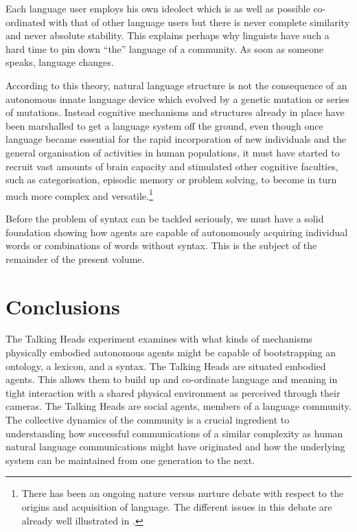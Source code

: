 Each language user employs his own ideolect which is 
as well as possible co-ordinated with that of other
language users but there is never complete similarity 
and never absolute stability.  
This explains perhaps why linguists have such a hard
time to pin down ``the'' language of a community. As soon 
as someone speaks, language changes. 

\enlargethispage{1\baselineskip}
According to this theory, natural language structure is
not the consequence of an 
autonomous innate language device which evolved 
by a genetic mutation or series of mutations. Instead 
cognitive mechanisms and structures already in place have been 
marshalled to get a language system off the ground, even though 
once language became essential for the rapid incorporation
of new individuals and the general organisation of 
activities in human populations, it must have started
to recruit vast amounts of brain capacity and stimulated 
other cognitive faculties, such as categorisation,
episodic memory or problem solving, to become in turn 
much more complex and versatile.\footnote{
There has been an ongoing nature versus nurture debate 
with respect to the origins and acquisition of language. 
The different issues in this debate are already well
illustrated in \cite{Piattelli:1980}.} 

Before the problem of syntax can 
be tackled seriously, we must have a solid foundation showing 
how agents are capable of autonomously acquiring individual words
or combinations of words without syntax. This is the subject of the
remainder of the present volume.

\section{Conclusions}

The Talking Heads experiment examines with what kinds
of mechanisms physically embodied autonomous agents 
might be capable of bootstrapping an ontology, a lexicon, 
and a syntax. The Talking Heads are situated embodied
agents. This 
allows them to build up and co-ordinate language and meaning 
in tight interaction with a shared physical environment
as perceived through their cameras. 
The Talking Heads are social agents, members of a
language community. The collective
dynamics of the community is a crucial ingredient to understanding
how successful communications of a similar complexity as
human natural language communications might have 
originated and how the underlying system can 
be maintained from one generation to the next. 

